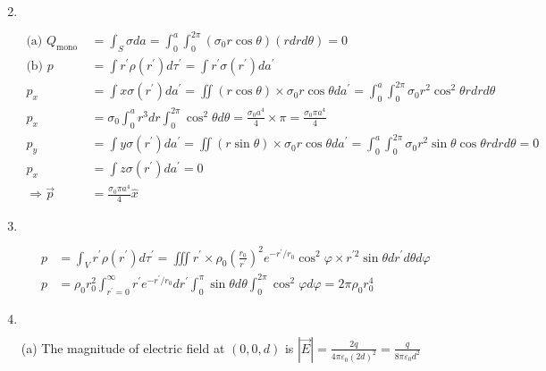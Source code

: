 \begin{enumerate}
\begin{answer}
\begin{align*}
		\end{align*}
	\end{answer}
	\item $\left. \right. $
	\begin{answer}
		\begin{align*}
		 \text{(a) }Q_{\text {mono }}&=\int_{S} \sigma d a=\int_{0}^{a} \int_{0}^{2 \pi}\left(\sigma_{0} r \cos \theta\right)(r d r d \theta)=0\\
		\text{(b) }p&=\int r^{\prime} \rho\left(r^{\prime}\right) d \tau^{\prime}=\int r^{\prime} \sigma\left(r^{\prime}\right) d a^{\prime}\\
		p_{x}&=\int x \sigma\left(r^{\prime}\right) d a^{\prime}=\iint(r \cos \theta) \times \sigma_{0} r \cos \theta d a^{\prime}=\int_{0}^{a} \int_{0}^{2 \pi} \sigma_{0} r^{2} \cos ^{2} \theta r d r d \theta \\
		p_{x}&=\sigma_{0} \int_{0}^{a} r^{3} d r \int_{0}^{2 \pi} \cos ^{2} \theta d \theta=\frac{\sigma_{0} a^{4}}{4} \times \pi=\frac{\sigma_{0} \pi a^{4}}{4}\\
		p_{y}&=\int y \sigma\left(r^{\prime}\right) d a^{\prime}=\iint(r \sin \theta) \times \sigma_{0} r \cos \theta d a^{\prime}=\int_{0}^{a} \int_{0}^{2 \pi} \sigma_{0} r^{2} \sin \theta \cos \theta r d r d \theta=0\\
		p_{x}&=\int z \sigma\left(r^{\prime}\right) d a^{\prime}=0\\
		\Rightarrow \vec{p}&=\frac{\sigma_{0} \pi a^{4}}{4} \hat{x}
		\end{align*}
	\end{answer}
	\item $\left. \right. $
	\begin{answer}
		\begin{align*}
		p&=\int_{V} r^{\prime} \rho\left(r^{\prime}\right) d \tau^{\prime}=\iiint r^{\prime} \times \rho_{0}\left(\frac{r_{0}}{r^{\prime}}\right)^{2} e^{-r^{\prime} / r_{0}} \cos ^{2} \varphi \times r^{\prime 2} \sin \theta d r^{\prime} d \theta d \varphi\\
		p&=\rho_{0} r_{0}^{2} \int_{r^{\prime}=0}^{\infty} r^{\prime} e^{-r^{\prime} / r_{0}} d r^{\prime} \int_{0}^{\pi} \sin \theta d \theta \int_{0}^{2 \pi} \cos ^{2} \varphi d \varphi=2 \pi \rho_{0} r_{0}^{4}
		\end{align*}
	\end{answer}
\item $\left. \right. $
	\begin{answer}
		(a) The magnitude of electric field at $(0,0, d)$ is $|\vec{E}|=\frac{2 q}{4 \pi \varepsilon_{0}(2 d)^{2}}=\frac{q}{8 \pi \varepsilon_{0} d^{2}}$\\

\end{answer}
\end{enumerate}
